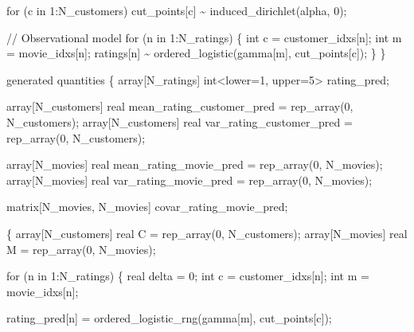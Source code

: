 \documentclass[
  letterpaper,
  DIV=11,
  numbers=noendperiod]{scrartcl}
\newenvironment{Shaded}{\begin{snugshade}}{\end{snugshade}}
\newcommand{\CommentTok}[1]{\textcolor[rgb]{0.37,0.37,0.37}{#1}}
\newcommand{\ControlFlowTok}[1]{\textcolor[rgb]{0.00,0.23,0.31}{#1}}
\newcommand{\DataTypeTok}[1]{\textcolor[rgb]{0.68,0.00,0.00}{#1}}
\newcommand{\DecValTok}[1]{\textcolor[rgb]{0.68,0.00,0.00}{#1}}
\newcommand{\KeywordTok}[1]{\textcolor[rgb]{0.00,0.23,0.31}{#1}}
\newcommand{\NormalTok}[1]{\textcolor[rgb]{0.00,0.23,0.31}{#1}}
\begin{document}
\begin{codelisting}
\begin{Shaded}
\begin{Highlighting}[]
  \ControlFlowTok{for}\NormalTok{ (c }\ControlFlowTok{in} \DecValTok{1}\NormalTok{:N\_customers)}
\NormalTok{    cut\_points[c] \textasciitilde{} induced\_dirichlet(alpha, }\DecValTok{0}\NormalTok{);}

  \CommentTok{// Observational model}
  \ControlFlowTok{for}\NormalTok{ (n }\ControlFlowTok{in} \DecValTok{1}\NormalTok{:N\_ratings) \{}
    \DataTypeTok{int}\NormalTok{ c = customer\_idxs[n];}
    \DataTypeTok{int}\NormalTok{ m = movie\_idxs[n];}
\NormalTok{    ratings[n] \textasciitilde{} ordered\_logistic(gamma[m], cut\_points[c]);}
\NormalTok{  \}}
\NormalTok{\}}

\KeywordTok{generated quantities}\NormalTok{ \{}
  \DataTypeTok{array}\NormalTok{[N\_ratings] }\DataTypeTok{int}\NormalTok{\textless{}}\KeywordTok{lower}\NormalTok{=}\DecValTok{1}\NormalTok{, }\KeywordTok{upper}\NormalTok{=}\DecValTok{5}\NormalTok{\textgreater{} rating\_pred;}

  \DataTypeTok{array}\NormalTok{[N\_customers] }\DataTypeTok{real}\NormalTok{ mean\_rating\_customer\_pred}
\NormalTok{    = rep\_array(}\DecValTok{0}\NormalTok{, N\_customers);}
  \DataTypeTok{array}\NormalTok{[N\_customers] }\DataTypeTok{real}\NormalTok{ var\_rating\_customer\_pred}
\NormalTok{    = rep\_array(}\DecValTok{0}\NormalTok{, N\_customers);}

  \DataTypeTok{array}\NormalTok{[N\_movies] }\DataTypeTok{real}\NormalTok{ mean\_rating\_movie\_pred = rep\_array(}\DecValTok{0}\NormalTok{, N\_movies);}
  \DataTypeTok{array}\NormalTok{[N\_movies] }\DataTypeTok{real}\NormalTok{ var\_rating\_movie\_pred = rep\_array(}\DecValTok{0}\NormalTok{, N\_movies);}

  \DataTypeTok{matrix}\NormalTok{[N\_movies, N\_movies] covar\_rating\_movie\_pred;}

\NormalTok{  \{}
    \DataTypeTok{array}\NormalTok{[N\_customers] }\DataTypeTok{real}\NormalTok{ C = rep\_array(}\DecValTok{0}\NormalTok{, N\_customers);}
    \DataTypeTok{array}\NormalTok{[N\_movies] }\DataTypeTok{real}\NormalTok{ M = rep\_array(}\DecValTok{0}\NormalTok{, N\_movies);}

    \ControlFlowTok{for}\NormalTok{ (n }\ControlFlowTok{in} \DecValTok{1}\NormalTok{:N\_ratings) \{}
      \DataTypeTok{real}\NormalTok{ delta = }\DecValTok{0}\NormalTok{;}
      \DataTypeTok{int}\NormalTok{ c = customer\_idxs[n];}
      \DataTypeTok{int}\NormalTok{ m = movie\_idxs[n];}

\NormalTok{      rating\_pred[n] = ordered\_logistic\_rng(gamma[m], cut\_points[c]);}


\end{Highlighting}
\end{Shaded}
\end{codelisting}
\end{document}
